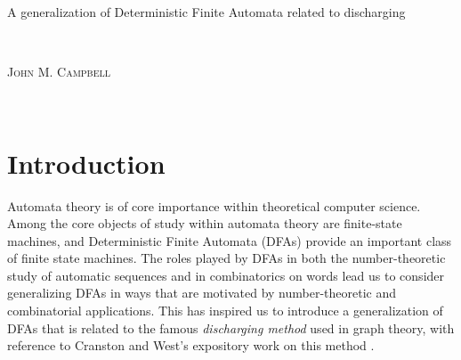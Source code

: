 \documentclass[12pt]{article}
\begin{document}
\begin{center}
{\Large A generalization of Deterministic Finite Automata related to discharging}

 \ 

{\textsc{John M. Campbell}} 

 \ 

\end{center}

\begin{abstract}
 Deterministic Finite Automata (DFAs) are of central importance in automata theory. In view of how state diagrams for DFAs are 
 defined using directed graphs, this leads us to introduce a generalization of DFAs related to a method widely used in graph theory 
 referred to as the \emph{discharging method}. Given a DFA $(Q, \Sigma, \delta, q_{0}, F)$, the transition function $\delta\colon Q \times 
 \Sigma \to Q$ determines a directed path in the corresponding state diagram based on an input string $a_{1} a_{2} \cdots a_{n}$ 
 consisting of characters in $\Sigma$, and our generalization can be thought of as being based on how each vertex in $D$ ``discharges'' 
 rational values to adjacent vertices (by analogy with the discharging method) depending on the string $a_{1} a_{2} \cdots a_{n}$ and 
 according to a fixed set of rules. We formalize this notion and pursue an exploration of the notion of a \emph{Discharging 
 Deterministic Finite Automaton} (DDFA) introduced in this paper. Our DDFA construction gives rise to a ring structure consisting of 
 sequences that we refer to as being \emph{quasi-$k$-regular}, and this ring generalizes the ring of $k$-regular sequences introduced 
 by Allouche and Shallit. 
\end{abstract}


\vspace{0.1in}


\section{Introduction}\label{sectionIntro}
 Automata theory is of core importance within theoretical computer science. Among the core objects of study within automata theory are 
 finite-state machines, and Deterministic Finite Automata (DFAs) provide an important class of finite state machines. The roles played 
 by DFAs in both the number-theoretic study of automatic sequences and in combinatorics on words lead us to consider generalizing 
 DFAs in ways that are motivated by number-theoretic and combinatorial applications. This has inspired us to introduce a 
 generalization of DFAs that is related to the famous \emph{discharging method} used in graph theory, with reference to Cranston and 
 West's expository work on this method \cite{CranstonWest2017}. 
\end{document}
